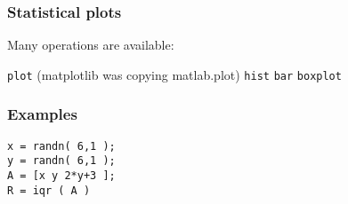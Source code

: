 \documentclass[11pt]{beamer}
\begin{document}
\begin{frame}[fragile]
  \frametitle{Statistical plots}
  \Enlarge

  \begin{enumerate}
  \myitem  Many operations are available:
    \begin{enumerate}
    \mysubitem \texttt{plot} (matplotlib was copying matlab.plot)
    \mysubitem \texttt{hist}
    \mysubitem \texttt{bar}
    \mysubitem \texttt{boxplot}
    \end{enumerate}
  \end{enumerate}
\end{frame}

\begin{frame}[fragile]
  \frametitle{Examples}
  \Enlarge
  \begin{Verbatim}
x = randn( 6,1 );
y = randn( 6,1 );
A = [x y 2*y+3 ];
R = iqr ( A )
  \end{Verbatim}
\end{frame}




\end{document}
